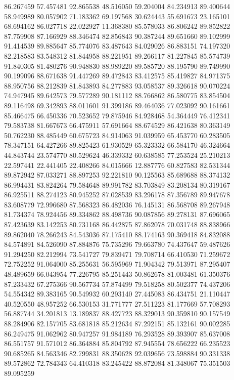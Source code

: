 86.267459
57.457481
92.865538
48.516050
59.204004
84.234913
89.400644
58.949989
80.057902
71.183362
69.197568
30.624443
55.691673
23.165101
68.694162
86.027718
22.022927
11.368380
85.578033
86.806242
89.852822
87.759908
87.166929
88.346474
82.856843
90.387244
89.651660
89.102999
91.414539
89.885647
85.774076
83.487643
84.029026
86.883151
74.197320
82.218583
83.548312
81.844958
88.221951
89.266117
81.227845
85.574739
91.840305
81.480276
90.948830
88.989220
89.585720
88.195790
89.749990
90.199096
88.671638
91.447269
89.472843
83.412575
85.419827
84.971375
88.950756
88.212839
81.843893
84.277883
93.058537
89.326618
90.070224
74.947945
89.642573
79.577289
90.181112
88.766862
86.580775
83.854504
89.116498
69.342893
88.011601
91.399186
89.464036
77.023092
90.161661
85.466475
66.450336
70.523652
79.875946
84.928468
54.364449
76.412341
79.583738
81.667673
66.475911
57.691664
88.674529
86.421638
80.363149
50.762230
88.485449
60.675723
84.914063
91.039959
65.453770
60.283505
78.347151
64.427266
89.825423
61.930529
65.323332
66.584170
46.324664
44.843744
23.574770
80.529624
46.339332
60.638585
77.253524
25.210213
22.597441
22.441405
22.408266
84.015666
12.887776
60.827583
82.531344
89.872942
87.033271
88.897253
92.221810
90.125563
85.689688
88.374132
86.994431
83.824264
79.584648
89.991782
83.703849
83.208134
80.319167
86.925511
88.274123
80.945252
87.028539
83.296178
87.356789
89.947678
83.608779
72.996680
87.568323
86.482036
76.145131
86.568708
89.267948
81.734374
78.924456
89.334862
88.498736
90.087856
89.278131
87.696065
87.423639
83.142253
80.731168
86.442875
87.862078
70.031748
88.838966
89.862040
78.266243
84.543036
87.175410
88.174163
90.369418
84.832088
84.574891
84.526090
87.884876
75.735296
79.663780
74.437647
59.487626
91.294250
82.212994
73.541727
79.839471
79.708714
66.410530
71.259672
72.752252
91.064000
85.255631
56.595969
71.904342
79.513971
87.295407
48.489659
66.043954
77.226795
85.251443
50.862678
81.003481
61.350376
87.233432
67.275366
90.567734
57.874499
79.518258
80.502377
74.437206
54.554342
89.383165
90.549932
60.293140
27.445083
86.434751
21.110447
40.520550
48.957252
66.530153
31.771777
27.511223
81.177669
57.708293
56.887744
34.201813
13.189837
88.427723
88.329013
90.359810
90.157549
88.284906
82.157705
83.681818
85.212634
87.292151
85.132161
90.002285
86.249475
91.062962
80.947257
91.984189
76.293528
89.393907
85.637008
86.551757
91.571012
86.364884
85.804792
87.945554
78.656222
66.235523
90.685265
84.563346
82.799831
88.350628
92.039656
73.598884
90.331338
89.572862
72.784343
64.410318
83.245422
88.872084
81.348067
75.351503
89.095259
